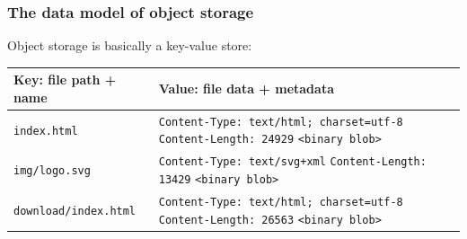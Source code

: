 \documentclass[aspectratio=169]{beamer}
\begin{document}
\begin{frame}
	\frametitle{The data model of object storage}
	Object storage is basically a key-value store:
	\vspace{1em}

		\begin{center}
		\begin{tabular}{|l|p{8cm}|}
			\hline
			\textbf{Key: file path + name} & \textbf{Value: file data + metadata} \\
			\hline
			\hline
			\texttt{index.html} &
				\texttt{Content-Type: text/html; charset=utf-8} \newline
				\texttt{Content-Length: 24929} \newline
				\texttt{<binary blob>} \\ 
			\hline
			\texttt{img/logo.svg} &
				\texttt{Content-Type: text/svg+xml} \newline
				\texttt{Content-Length: 13429} \newline
				\texttt{<binary blob>} \\ 
			\hline
			\texttt{download/index.html} &
				\texttt{Content-Type: text/html; charset=utf-8} \newline
				\texttt{Content-Length: 26563} \newline
				\texttt{<binary blob>} \\ 
			\hline
		\end{tabular}
		\end{center}
\end{frame}
\end{document}
